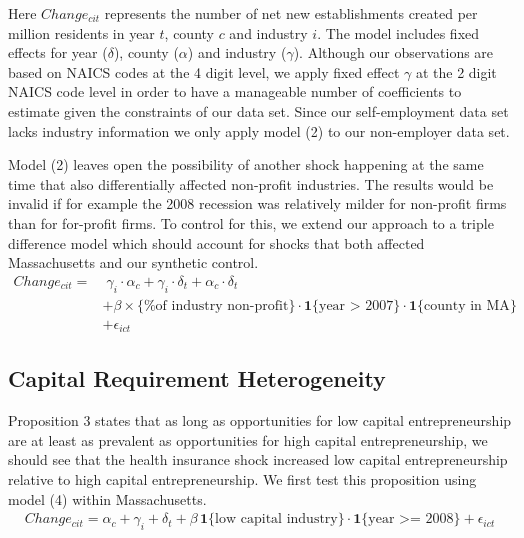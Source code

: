 \documentclass[12pt]{article}
\begin{document}
Here $Change_{cit}$ represents the number of net new establishments created per million residents in year $t$, county $c$ and industry $i$. The model includes fixed effects for year ($\delta$), county ($\alpha$) and industry ($\gamma$). Although our observations are based on NAICS codes at the 4 digit level, we apply fixed effect $\gamma$ at the 2 digit NAICS code level in order to have a manageable number of coefficients to estimate given the constraints of our data set. Since our self-employment data set lacks industry information we only apply model (2) to our non-employer data set. 

Model (2) leaves open the possibility of another shock happening at the same time that also differentially affected non-profit industries. The results would be invalid if for example the 2008 recession was relatively milder for non-profit firms than for for-profit firms. To control for this, we extend our approach to a triple difference model which should account for shocks that both affected Massachusetts and our synthetic control. 
\begin{align}
Change_{cit} = & \; \gamma_i \cdot \alpha_c + \gamma_i \cdot \delta_t +  \alpha_c \cdot \delta_t \nonumber   \\
& + \beta  \times \{\text{\% of industry non-profit}\} \cdot \mathbf{1}\{\text{year > 2007}\}  \cdot \mathbf{1}\{\text{county in  MA}\} \nonumber  \\
& + \epsilon_{ict}
\end{align}



\subsection{Capital Requirement Heterogeneity}

Proposition 3 states that as long as opportunities for low capital entrepreneurship are at least as prevalent as opportunities for high capital entrepreneurship, we should see that the health insurance shock increased low capital entrepreneurship relative to high capital entrepreneurship. We first test this proposition using model (4) within Massachusetts. 
\begin{align}
Change_{cit} =  \alpha_c + \gamma_i+ \delta_t + \beta \, \mathbf{1}\{\text{low capital industry}\} \cdot \mathbf{1}\{\text{year >= 2008}\} + \epsilon_{ict}
\end{align}
\end{document}
